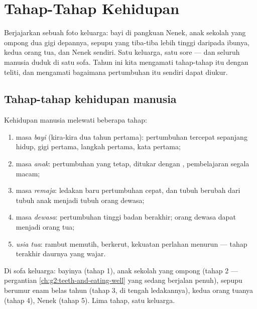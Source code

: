 \chapter{Tahap-Tahap Kehidupan}\label{ch:g3:stages-of-life}

Berjajarkan sebuah foto keluarga: bayi di pangkuan Nenek, anak sekolah
yang ompong dua gigi depannya, sepupu  yang tiba-tiba lebih
tinggi daripada ibunya, kedua orang tua, dan Nenek sendiri. Satu
keluarga, satu sore --- dan seluruh  manusia duduk di satu
sofa. Tahun ini kita mengamati tahap-tahap itu dengan teliti, dan
mengamati bagaimana pertumbuhan itu sendiri dapat diukur.

\section{Tahap-tahap kehidupan manusia}

\begin{definition}\label{def:g3:stages-of-life:stages}
Kehidupan manusia melewati beberapa tahap:
\begin{enumerate}
  \item masa \emph{bayi} (kira-kira dua tahun pertama):
        pertumbuhan tercepat sepanjang hidup, gigi pertama, langkah
        pertama, kata pertama;
  \item masa \emph{anak}: pertumbuhan yang tetap,  ditukar dengan , pembelajaran segala macam;
  \item masa \emph{remaja}: ledakan baru pertumbuhan
        cepat, dan tubuh berubah dari tubuh anak menjadi tubuh orang
        dewasa;
  \item masa \emph{dewasa}: pertumbuhan tinggi badan
        berakhir; orang dewasa dapat menjadi orang tua;
  \item \emph{usia tua}: rambut memutih, 
        berkerut, kekuatan perlahan menurun --- tahap terakhir daurnya
        yang wajar.
\end{enumerate}
\end{definition}

\begin{example}\label{ex:g3:stages-of-life:sofa}
Di sofa keluarga: bayinya (tahap 1), anak sekolah yang ompong (tahap 2
--- pergantian \cref{ch:g2:teeth-and-eating-well} yang sedang berjalan
penuh), sepupu berumur enam belas tahun (tahap 3, di tengah
ledakannya), kedua orang tuanya (tahap 4), Nenek (tahap 5). Lima
tahap, satu keluarga.
\end{example}

